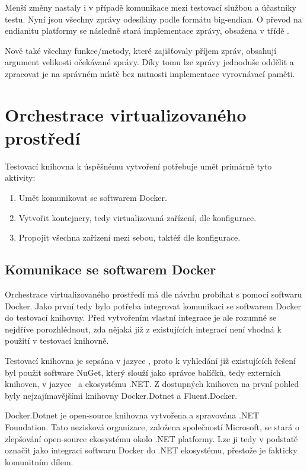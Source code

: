 Menší změny nastaly i v případě komunikace mezi testovací službou a účastníky testu. Nyní jsou všechny zprávy odesílány podle formátu big-endian. O převod na endianitu platformy se následně stará implementace zprávy, obsažena v třídě . 

Nově také všechny funkce/metody, které zajišťovaly příjem zpráv, obsahují argument velikosti očekávané zprávy. Díky tomu lze zprávy jednoduše oddělit a zpracovat je na správném místě bez nutnosti implementace vyrovnávací paměti.

\section{Orchestrace virtualizovaného prostředí}

Testovací knihovna k úspěšnému vytvoření potřebuje umět primárně tyto aktivity:

\begin{enumerate}
    \item Umět komunikovat se softwarem Docker.
    \item Vytvořit kontejnery, tedy virtualizovaná zařízení, dle konfigurace.
    \item Propojit všechna zařízení mezi sebou, taktéž dle konfigurace.
\end{enumerate}

\subsection{Komunikace se softwarem Docker}
Orchestrace virtualizovaného prostředí má dle návrhu probíhat s pomocí softwaru Docker. 
Jako první tedy bylo potřeba integrovat komunikaci se softwarem Docker do testovací knihovny. Před vytvořením vlastní integrace je ale rozumné se nejdříve porozhlédnout, zda nějaká již z existujících integrací není vhodná k použití v testovací knihovně. 

Testovací knihovna je sepsána v jazyce \csharp, proto k vyhledání již existujících řešení byl použit software NuGet\cite{nuget}, který slouží jako správce balíčků, tedy externích knihoven, v jazyce \csharp\, a ekosystému .NET. Z dostupných knihoven na první pohled byly nejzajímavějšími knihovny Docker.Dotnet\cite{dockerdotnet} a Fluent.Docker\cite{fluentdocker}. 

Docker.Dotnet je open-source knihovna vytvořena a spravována .NET Foundation. Tato nezisková organizace, založena společností Microsoft, se stará o zlepšování open-source ekosystému okolo .NET platformy\cite{dotnetfoundation}. Lze ji tedy v podstatě označit jako  integraci softwaru Docker do .NET ekosystému, přestože je fakticky komunitním dílem. 

